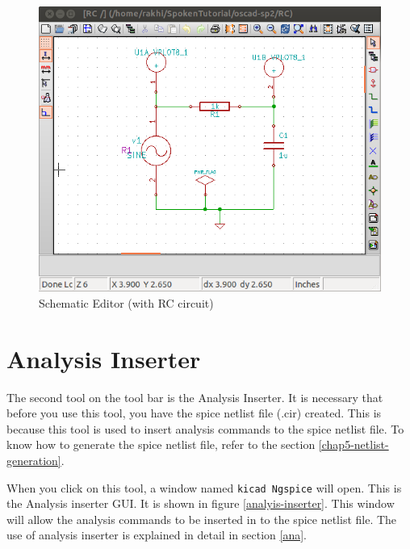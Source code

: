 \begin{figure}
\begin{center}
\includegraphics[width=0.8\linewidth]{figures/eeschema.png}
\caption{Schematic Editor (with RC circuit)}
\label{eeschema}
\end{center}
\end{figure}



\section{Analysis Inserter}\label{subsec-analyis-inserter}

The second tool on the tool bar is the Analysis Inserter. It is necessary that before you use this tool, you have the spice netlist file (.cir) created. This is because this tool is used to insert analysis commands to the spice netlist file. To know how to generate the spice netlist file, refer to the section \ref{chap5-netlist-generation}.

When you click on this tool, a window named {\tt kicad Ngspice} will open. This is the Analysis inserter GUI. It is shown in figure \ref{analyis-inserter}. This window will allow the analysis commands to be inserted in to the spice netlist file. The use of analysis inserter is explained in detail in section \ref{ana}.

